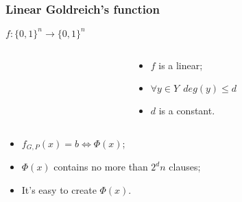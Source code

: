 \begin{frame}
	\frametitle{Linear Goldreich's function}
	$f:\{0, 1\}^n \rightarrow \{0, 1\}^n$

    \pause

    \begin{columns}
    	\begin{column}{5.5cm}
            
        \end{column}

        \pause
        \pause
        \begin{column}{5.5cm}
            \begin{itemize}
	            \item $f$ is a linear;
            	\pause
                \item $\forall y \in Y ~~ deg(y) \le d$
            	\pause
            	\item $d$ is a constant.
            \end{itemize}
        \end{column}
	\end{columns}
    
	\pause
    \begin{itemize}
	    \item $f_{G, P}(x) = b \Leftrightarrow \Phi(x)$;
    	\pause
	    \item $\Phi(x)$ contains no more than $2^dn$ clauses;
    	\pause
    	\item It's easy to create $\Phi(x)$.
    \end{itemize}
\end{frame}

